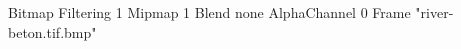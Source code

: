 {Bitmap
	{Filtering 1}
	{Mipmap 1}
	{Blend none}
	{AlphaChannel 0}
	{Frame "river-beton.tif.bmp"}
}
